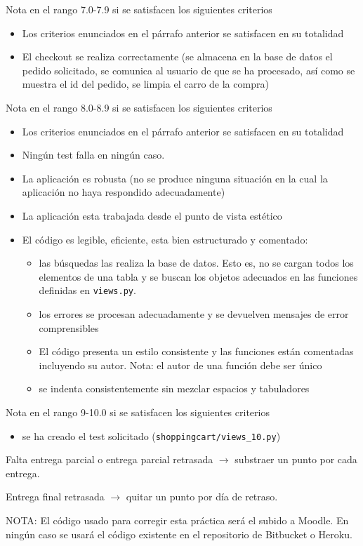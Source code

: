 \documentclass[12pt]{article} %
\newcommand{\ttt}[1]{\texttt{#1}}%
\newcommand{\views}{\texttt{views.py}}%
\begin{document}
Nota en el rango 7.0-7.9 si se satisfacen los siguientes criterios
 \begin{itemize}
 \item Los criterios enunciados en el párrafo anterior se satisfacen en su totalidad
 \item El checkout se realiza correctamente (se almacena en la base de datos el pedido solicitado, se comunica al usuario de que se ha procesado, así como se muestra el id del pedido, se limpia el carro de la compra)
 \end{itemize}
 
Nota en el rango 8.0-8.9 si se satisfacen los siguientes criterios
 \begin{itemize}
 \item Los criterios enunciados en el párrafo anterior se satisfacen en su totalidad 
 \item Ningún test falla en ningún caso.
 \item La aplicación es robusta (no se produce ninguna situación en la cual la aplicación no haya respondido adecuadamente)
 \item La aplicación esta trabajada desde el punto de vista estético
 \item El código es legible, eficiente, esta bien estructurado y comentado:
    \begin{itemize}
        \item  las búsquedas las realiza la base de datos. Esto es, no se cargan todos los elementos de una tabla y se buscan los objetos adecuados en las funciones definidas en \views.
        \item  los errores se procesan adecuadamente y se devuelven mensajes de error comprensibles
        \item  El código presenta un estilo consistente y las funciones están comentadas incluyendo su autor. Nota: el autor de una función debe ser único
        \item se indenta consistentemente sin mezclar espacios y tabuladores
    \end{itemize}
\end{itemize}

Nota en el rango 9-10.0 si se satisfacen los siguientes criterios
 \begin{itemize}
    \item se ha creado el test solicitado (\ttt{shoppingcart/views\_10.py})
 \end{itemize}

Falta entrega parcial o entrega parcial retrasada $\rightarrow$ substraer un punto por cada entrega. 
 
 Entrega final retrasada $\rightarrow$ quitar un punto por día de retraso.

 NOTA: El código usado para corregir esta práctica será el subido a Moodle. En ningún caso se usará el código existente en el repositorio de Bitbucket o Heroku.
\end{document}
